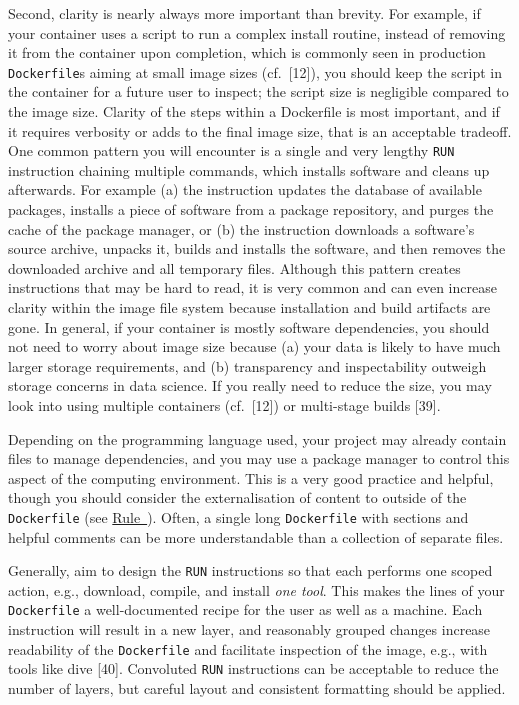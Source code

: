\documentclass[10pt,letterpaper]{article}
\begin{document}
Second, clarity is nearly always more important than brevity. For
example, if your container uses a script to run a complex install
routine, instead of removing it from the container upon completion,
which is commonly seen in production \texttt{Dockerfile}s aiming at
small image sizes (cf.~{[}12{]}), you should keep the script in the
container for a future user to inspect; the script size is negligible
compared to the image size. Clarity of the steps within a Dockerfile is
most important, and if it requires verbosity or adds to the final image
size, that is an acceptable tradeoff. One common pattern you will
encounter is a single and very lengthy \texttt{RUN} instruction chaining
multiple commands, which installs software and cleans up afterwards. For
example (a) the instruction updates the database of available packages,
installs a piece of software from a package repository, and purges the
cache of the package manager, or (b) the instruction downloads a
software's source archive, unpacks it, builds and installs the software,
and then removes the downloaded archive and all temporary files.
Although this pattern creates instructions that may be hard to read, it
is very common and can even increase clarity within the image file
system because installation and build artifacts are gone. In general, if
your container is mostly software dependencies, you should not need to
worry about image size because (a) your data is likely to have much
larger storage requirements, and (b) transparency and inspectability
outweigh storage concerns in data science. If you really need to reduce
the size, you may look into using multiple containers (cf.~{[}12{]}) or
multi-stage builds {[}39{]}.

Depending on the programming language used, your project may already
contain files to manage dependencies, and you may use a package manager
to control this aspect of the computing environment. This is a very good
practice and helpful, though you should consider the externalisation of
content to outside of the \texttt{Dockerfile} (see
\hyperref[{rule:mount}]{Rule~}). Often, a single
long \texttt{Dockerfile} with sections and helpful comments can be more
understandable than a collection of separate files.

Generally, aim to design the \texttt{RUN} instructions so that each
performs one scoped action, e.g., download, compile, and install
\emph{one tool}. This makes the lines of your \texttt{Dockerfile} a
well-documented recipe for the user as well as a machine. Each
instruction will result in a new layer, and reasonably grouped changes
increase readability of the \texttt{Dockerfile} and facilitate
inspection of the image, e.g., with tools like dive {[}40{]}. Convoluted
\texttt{RUN} instructions can be acceptable to reduce the number of
layers, but careful layout and consistent formatting should be applied.
\end{document}
